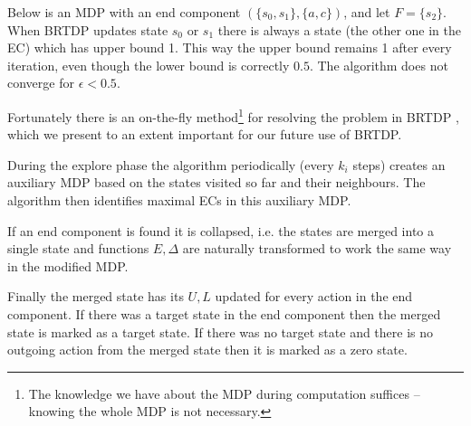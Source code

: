 \begin{example}
    Below is an MDP with an end component
    $(\{s_0, s_1\}, \{a,c\})$, and let $F = \{s_2\}$.
    When BRTDP updates state $s_0$ or $s_1$ there is always a state (the
    other one in the EC) which has upper bound 1. This way the upper
    bound remains 1 after every iteration, even though the lower bound
    is correctly $0.5$. The algorithm does not converge for $\epsilon <
    0.5$.

\begin{center}
\end{center}
\end{example}

Fortunately there is an on-the-fly method\footnote{The knowledge we have
about the MDP during computation suffices -- knowing the whole MDP is
not necessary.}
for resolving the problem in BRTDP
\parencite{atva14}, which we present to an extent important for our
future use of BRTDP.

During the explore phase the algorithm periodically (every $k_i$
steps) creates an auxiliary MDP based on the states visited so far and
their neighbours. The algorithm then identifies maximal ECs in this auxiliary
MDP.

If an end component is found it is collapsed, i.e. the states are merged into a
single state and functions $E, \Delta$ are naturally transformed to work
the same way in the modified MDP.

Finally the merged state has its $U, L$ updated for every action in the
end component. If there was a target state in the end component then the
merged state is marked as a target state. If there was no target state and
there is no outgoing action from the merged state then it is marked as a
zero state.

